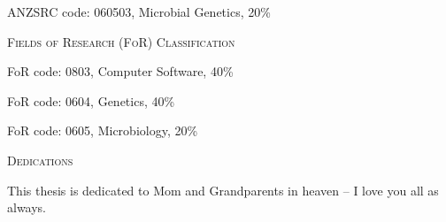 ANZSRC code: 060503, Microbial Genetics, 20\%
\vspace{2cm}

\begin{center}
\Large \textsc{Fields of Research (FoR) Classification}
\end{center}

FoR code: 0803, Computer Software, 40\%

FoR code: 0604, Genetics, 40\%

FoR code: 0605, Microbiology, 20\%
\afterpage{\null\thispagestyle{empty}\newpage}
\newpage

\thispagestyle{plain}

\begin{center}
\Large \textsc{Dedications}
\end{center}

This thesis is dedicated to Mom and Grandparents in heaven -- I love you all as always.


\afterpage{\null\thispagestyle{empty}\newpage}
\newpage